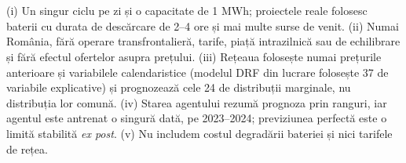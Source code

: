 \section{}
%
{(i) Un singur ciclu pe zi și o capacitate de 1 MWh; proiectele reale folosesc baterii cu durata de descărcare de 2--4 ore și mai multe surse de venit. (ii) Numai România, fără operare transfrontalieră, tarife, piață intrazilnică sau de echilibrare și fără efectul ofertelor asupra prețului.
(iii) Rețeaua folosește numai prețurile anterioare și variabilele calendaristice (modelul DRF din lucrare folosește 37 de variabile explicative) și prognozează cele 24 de distribuții marginale, nu distribuția lor comună.
(iv) Starea agentului rezumă prognoza prin ranguri, iar agentul este antrenat o singură dată, pe 2023--2024; previziunea perfectă este o limită stabilită \emph{ex post}. (v) Nu includem costul degradării bateriei și nici tarifele de rețea.}

\newpage
